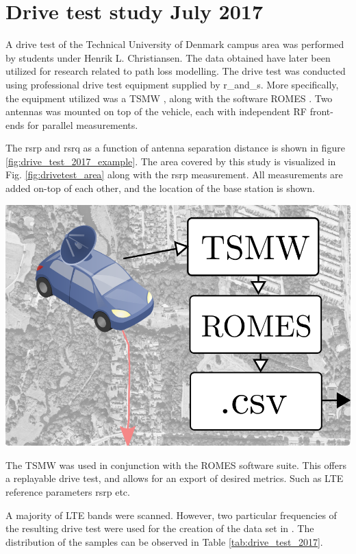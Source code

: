 \chapter{Drive test study July 2017}\label{app:drive_test_study_2017}

A drive test of the Technical University of Denmark campus area was performed by students under Henrik L. Christiansen. The data obtained have later been utilized for research related to path loss modelling. The drive test was conducted using professional drive test equipment supplied by \gls{r_and_s}. More specifically, the equipment utilized was a TSMW \cite{Manual2017}, along with the software ROMES \cite{ROMESmanual}. Two antennas was mounted on top of the vehicle, each with independent RF front-ends for parallel measurements.

The \gls{rsrp} and \gls{rsrq} as a function of antenna separation distance is shown in figure \ref{fig:drive_test_2017_example}.
The area covered by this study is visualized in Fig. \ref{fig:drivetest_area} along with the \gls{rsrp} measurement. All measurements are added on-top of each other, and the location of the base station is shown.

\begin{marginfigure}
\includegraphics[]{appendix/figures/drive_test_equipment.png}
\caption{The TSMW was used in conjunction with the ROMES software suite. This offers a replayable drive test, and allows for an export of desired metrics. Such as LTE reference parameters \gls{rsrp} etc.}
\end{marginfigure}

A majority of LTE bands were scanned. However, two particular frequencies of the resulting drive test were used for the creation of the data set in \cite{1xf4-eg98-19}. The distribution of the samples can be observed in Table \ref{tab:drive_test_2017}.

